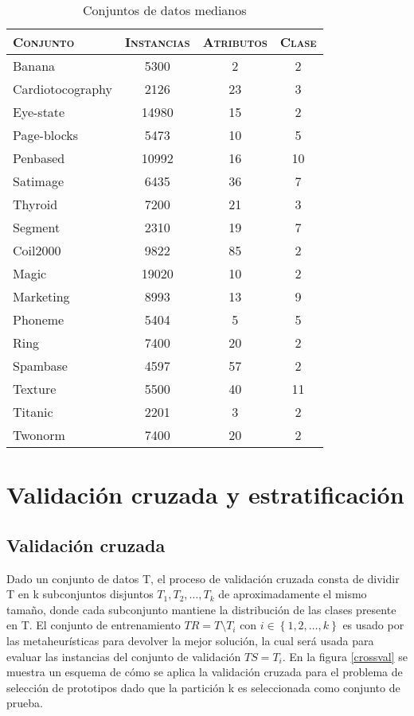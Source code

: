 \newpage

\begin{table}[h!]
\centering
\begin{tabular}{l c c c}
\hline
\textsc{Conjunto} & \textsc{Instancias} & \textsc{Atributos} & \textsc{Clase} \\
\hline
\hline

Banana           &  5300 &  2 & 2 \\
Cardiotocography &  2126 & 23 & 3 \\
Eye-state        & 14980 & 15 & 2 \\
Page-blocks      &  5473 & 10 & 5 \\
Penbased         & 10992 & 16 & 10 \\
Satimage         &  6435 & 36 & 7 \\
Thyroid          &  7200 & 21 & 3 \\
Segment          &  2310 & 19 & 7 \\
Coil2000         &  9822 & 85 & 2 \\
Magic            & 19020 & 10 & 2 \\
Marketing        &  8993 & 13 & 9 \\
Phoneme          &  5404 & 5  & 5 \\
Ring             &  7400 & 20 & 2 \\
Spambase         &  4597 & 57 & 2 \\
Texture          &  5500 & 40 & 11 \\
Titanic          &  2201 &  3 & 2  \\
Twonorm          &  7400 & 20 & 2 \\

\hline
\end{tabular}
\caption{Conjuntos de datos medianos}
\label{medianos}
\end{table}



\newpage

\section{Validación cruzada y estratificación}

\subsection{Validación cruzada}

Dado un conjunto de datos T, el proceso de validación cruzada \cite{kohavi1995study} consta de dividir T en k subconjuntos disjuntos $T_1,T_2,\dots,T_k$ de aproximadamente el mismo tamaño, donde cada subconjunto mantiene la distribución de las clases presente en T. El conjunto de entrenamiento $TR = T \setminus T_i$ con $i \in \left\{1,2,\dots,k\right\}$ es usado por las metaheurísticas para devolver la mejor solución, la cual será usada para evaluar las instancias del conjunto de validación $ TS = T_i $. En la figura \ref{crossval} se muestra un esquema de cómo se aplica la validación cruzada para el problema de selección de prototipos dado que la partición k es seleccionada como conjunto de prueba.

